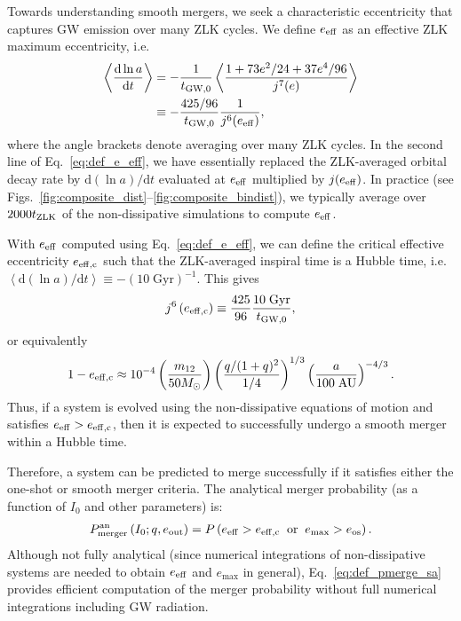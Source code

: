 \documentclass[
        fleqn,
        usenatbib,
    ]{mnras}
\newcommand*{\rd}[2]{\frac{\mathrm{d}#1}{\mathrm{d}#2}}
\newcommand*{\rdil}[2]{\mathrm{d}#1/\mathrm{d}#2}
\newcommand*{\ev}[1]{\left\langle#1\right\rangle}
\newcommand*{\p}[1]{\left(#1\right)}
\begin{document}
Towards understanding smooth mergers, we seek a characteristic eccentricity that
captures GW emission over many ZLK cycles. We define $e_{\rm eff}$ as an
effective ZLK maximum eccentricity, i.e.
\begin{align}
    \ev{\rd{\ln a}{t}} &= -\frac{1}{t_{\rm GW, 0}}
            \ev{\frac{1 + 73e^2/24 + 37e^4/96}
                {j^7(e)}}\nonumber\\
        &\equiv -\frac{425/96}{t_{\rm GW, 0}}\frac{1}{j^6(e_{\rm eff})},
        \label{eq:def_e_eff}
\end{align}
where the angle brackets denote averaging over many ZLK cycles. In the second
line of Eq.~\eqref{eq:def_e_eff}, we have essentially replaced the ZLK-averaged
orbital decay rate by $\rdil{(\ln a)}{t}$ evaluated at $e_{\rm eff}$ multiplied
by $j(e_{\rm eff})$. In practice (see
Figs.~\ref{fig:composite_dist}--\ref{fig:composite_bindist}), we typically
average over $2000 t_{\rm ZLK}$ of the non-dissipative simulations to compute
$e_{\rm eff}$.

With $e_{\rm eff}$ computed using Eq.~\eqref{eq:def_e_eff}, we can define the
critical effective eccentricity $e_{\rm eff, c}$ such that the ZLK-averaged
inspiral time is a Hubble time, i.e.\ $\ev{\rdil{(\ln a)}{t}} \equiv
-\p{10\;\mathrm{Gyr}}^{-1}$. This gives
\begin{align}
    j^6\p{e_{\rm eff, c}} \equiv \frac{425}{96}\frac{10\;\mathrm{Gyr}}{t_{\rm
        GW, 0}}, \label{eq:def_e_eff_c}
\end{align}
or equivalently
\begin{align}
    1 - e_{\rm eff, c} \approx 10^{-4}
        \p{\frac{m_{12}}{50M_{\odot}}}
        \p{\frac{q / (1 + q)^2}{1/4}}^{1/3}
        \p{\frac{a}{100\;\mathrm{AU}}}^{-4/3}.
\end{align}
Thus, if a system is evolved using the non-dissipative equations of motion and
satisfies $e_{\rm eff} > e_{\rm eff, c}$, then it is expected to successfully
undergo a smooth merger within a Hubble time.

Therefore, a system can be predicted to merge successfully if it satisfies either
the one-shot or smooth merger criteria. The analytical merger probability (as a
function of $I_0$ and other parameters) is:
\begin{align}
    P_{\rm merger}^{\rm an}\p{I_0; q, e_{\rm out}} =
        P\p{e_{\rm eff} > e_{\rm eff, c} \;\;\text{or}\;\;
        e_{\max} > e_{\rm os}}.\label{eq:def_pmerge_sa}
\end{align}
Although not fully analytical (since numerical integrations of non-dissipative
systems are needed to obtain $e_{\rm eff}$ and $e_{\max}$ in general),
Eq.~\eqref{eq:def_pmerge_sa} provides efficient computation of the merger
probability without full numerical integrations including GW radiation.
\end{document}
